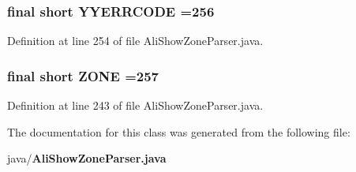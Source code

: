 \subsubsection[{Y\+Y\+E\+R\+R\+C\+O\+D\+E}]{\setlength{\rightskip}{0pt plus 5cm}final short Y\+Y\+E\+R\+R\+C\+O\+D\+E =256\hspace{0.3cm}{\ttfamily [static]}}\label{classorg_1_1smallfoot_1_1parser_1_1zone_1_1AliShowZoneParser_a1c58472ea6621d2f613831e08d10dba3}


Definition at line 254 of file Ali\+Show\+Zone\+Parser.\+java.

\subsubsection[{Z\+O\+N\+E}]{\setlength{\rightskip}{0pt plus 5cm}final short Z\+O\+N\+E =257\hspace{0.3cm}{\ttfamily [static]}}\label{classorg_1_1smallfoot_1_1parser_1_1zone_1_1AliShowZoneParser_a8ddd6c0fce0f972519976a2c9ca1aadd}


Definition at line 243 of file Ali\+Show\+Zone\+Parser.\+java.



The documentation for this class was generated from the following file\+:\begin{DoxyCompactItemize}
\item 
java/{\bf Ali\+Show\+Zone\+Parser.\+java}\end{DoxyCompactItemize}
